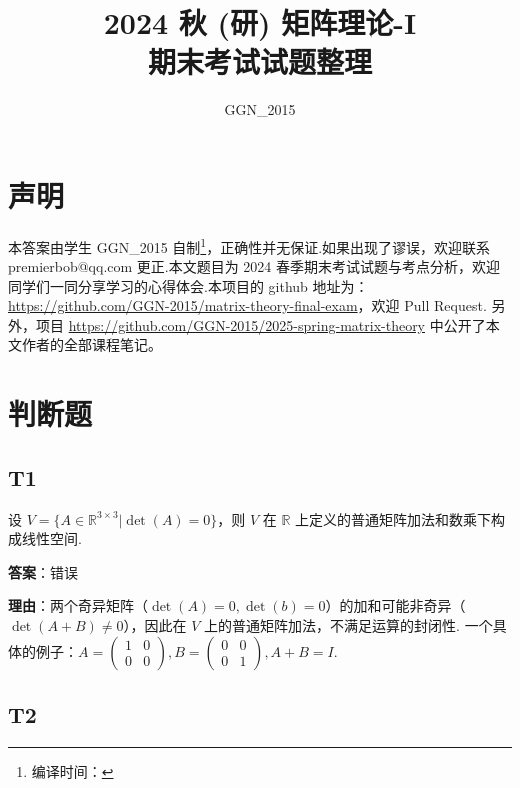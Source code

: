 \documentclass{article}
\title{2024 秋 (研) 矩阵理论-I\\期末考试试题整理}
\author{GGN\_2015}
\date{}
\newcommand{\getcompiletimestamp}{
	编译时间：\DTMnow
}
\begin{document}
\maketitle

\section{声明}

本答案由学生 GGN\_2015 自制\footnote{\getcompiletimestamp}，正确性并无保证.如果出现了谬误，欢迎联系 premierbob@qq.com 更正.本文题目为 2024 春季期末考试试题与考点分析，欢迎同学们一同分享学习的心得体会.本项目的 github 地址为：\href{https://github.com/GGN-2015/matrix-theory-final-exam}{https://github.com/GGN-2015/matrix-theory-final-exam}，欢迎 Pull Request. 另外，项目 \href{https://github.com/GGN-2015/2025-spring-matrix-theory}{https://github.com/GGN-2015/2025-spring-matrix-theory} 中公开了本文作者的全部课程笔记。



\newpage

\tableofcontents

\newpage

\section{判断题}

\subsection{T1}

\par 设 \(V=\{A\in \mathbb R^{3\times 3}| \det(A) = 0\}\)，则 $V$ 在 $\mathbb R$ 上定义的普通矩阵加法和数乘下构成线性空间.

\par \textbf{答案}：错误

\par \textbf{理由}：两个奇异矩阵（$\det(A)=0, \det(b)=0$）的加和可能非奇异（$\det(A+B)\neq 0$），因此在 $V$ 上的普通矩阵加法，不满足运算的封闭性. 一个具体的例子：$A=\begin{pmatrix}
	1 & 0\\
	0 & 0
\end{pmatrix}, B = \begin{pmatrix}
	0 & 0\\
	0 & 1
\end{pmatrix}, A+B=I$.

\subsection{T2}
\end{document}
